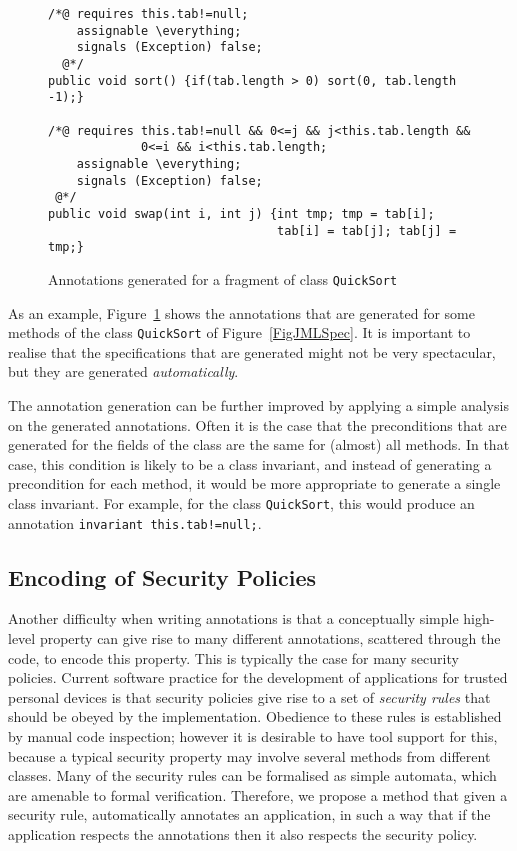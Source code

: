 
\begin{figure}[t!]
{\small
\begin{verbatim}
/*@ requires this.tab!=null;
    assignable \everything;
    signals (Exception) false;
  @*/
public void sort() {if(tab.length > 0) sort(0, tab.length -1);}

/*@ requires this.tab!=null && 0<=j && j<this.tab.length &&
             0<=i && i<this.tab.length;
    assignable \everything;
    signals (Exception) false;
 @*/
public void swap(int i, int j) {int tmp; tmp = tab[i]; 
                                tab[i] = tab[j]; tab[j] = tmp;}
\end{verbatim}
}
\caption{Annotations generated for a fragment of class
\texttt{QuickSort}}\label{FigAnnotSpec} 
\end{figure}

As an example, Figure~\ref{FigAnnotSpec} shows the annotations that
are generated for some methods of the class \texttt{QuickSort} of
Figure~\ref{FigJMLSpec}.
It is important to realise that the specifications that
are generated might not be very spectacular, but they are
generated \emph{automatically}. %

The annotation generation can be further improved by applying a simple
analysis on the generated annotations. Often it is the case that the
preconditions that are generated for the fields of the class are the
same for (almost) all methods. In that case, this condition is likely
to be a class invariant, and instead of generating a precondition for
each method, it would be more appropriate to generate a single class
invariant. For example, for the class
\texttt{QuickSort}, this would produce an annotation
\texttt{invariant this.tab!=null;}. %

\subsection{Encoding of Security Policies}

Another difficulty when writing annotations is that a conceptually
simple high-level property can give rise to many different
annotations, scattered through the code, to encode this property. This
is typically the case for many security policies. Current software
practice for the development of applications for trusted personal
devices is that security policies give rise to a set of \emph{security
rules} that should be obeyed by the implementation. Obedience to these
rules is established by manual code inspection; however it is
desirable to have tool support for this, because a typical security
property may involve several methods from different classes.  Many of
the security rules can be formalised as simple automata, which are
amenable to formal verification. Therefore, we propose a method that
given a security rule, automatically annotates an application, in such
a way that if the application respects the annotations then it also
respects the security policy.

